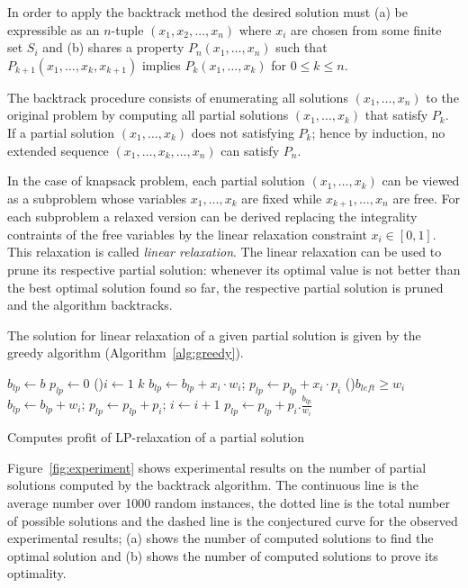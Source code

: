 \documentclass{article}
\begin{document}
In order to apply the backtrack method the desired solution must (a) be
expressible as an $n$-tuple $(x_1, x_2, \ldots, x_n)$ where $x_i$ are chosen
from some finite set $S_i$ and (b) shares a property $P_n(x_1, \ldots, x_n)$
such that $P_{k+1}(x_1, \ldots, x_k, x_{k+1})$ implies $P_{k}(x_1, \ldots, x_k)$
for $0 \leqslant k \leqslant n$.

The backtrack procedure consists of enumerating all solutions $(x_1, \ldots, x_n)$
to the original problem by computing all partial solutions $(x_1, \ldots, x_k)$
that satisfy $P_k$.
If a partial solution $(x_1, \ldots, x_k)$ does not satisfying $P_k$; hence by induction,
no extended sequence $(x_1, \ldots, x_k, \ldots, x_n)$ can satisfy $P_n$.

In the case of knapsack problem, each partial solution $(x_1, \ldots, x_k)$ can be
viewed as a subproblem whose variables $x_1, \ldots, x_k$ are fixed while $x_{k+1}, \ldots,
x_n$ are free.
For each subproblem a relaxed version can be derived
replacing the integrality contraints of the free variables
by the linear relaxation constraint $x_i \in [0, 1]$.
This relaxation is called {\it linear relaxation}.
The linear relaxation can be used to prune its respective partial solution:
whenever its optimal value is not better than the best optimal solution found so far,
the respective partial solution is pruned and the algorithm backtracks.

The solution for linear relaxation of a given partial solution is given by
the greedy algorithm (Algorithm~\ref{alg:greedy}).

\begin{algorithm}[H]
 $b_{lp} \leftarrow b$\;
 $p_{lp} \leftarrow 0$\;
 \For(){$i \leftarrow 1$ \KwTo $k$}{
 	$b_{lp} \leftarrow b_{lp} + x_i \cdot w_i$;
 	$p_{lp} \leftarrow p_{lp} + x_i \cdot p_i$\;
 }
 \While(){$b_{left} \geqslant w_i$}{
 	$b_{lp} \leftarrow b_{lp} + w_i$;
 	$p_{lp} \leftarrow p_{lp} + p_i$;
	$i \leftarrow i+1$\;
 }
 $p_{lp} \leftarrow p_{lp} + p_i.\frac{b_{lp}}{w_i}$
 \caption{Computes profit of LP-relaxation of a partial solution}
 \label{alg:greedy}
\end{algorithm}

Figure~\ref{fig:experiment} shows experimental results on the number of partial
solutions computed by the backtrack algorithm.
The continuous line is the average number over 1000 random instances,
the dotted line is the total number of possible solutions and
the dashed line is the conjectured curve for the observed experimental results;
(a) shows the number of computed solutions to find the optimal solution and
(b) shows the number of computed solutions to prove its optimality.
\end{document}
